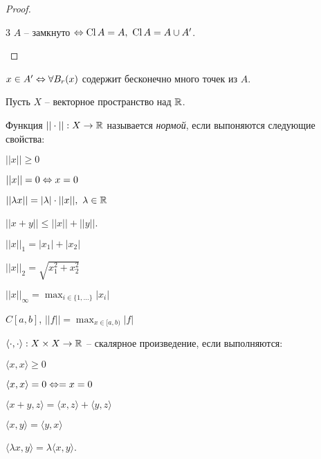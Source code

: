     \begin{proof}
        \begin{MyList}
            \item[3] $A$ -- замкнуто $\Leftrightarrow \operatorname{Cl} A = A, \ \operatorname{Cl} A = A \cup A'$.
        \end{MyList}
    \end{proof}

    \begin{Thm}
        $x \in A' \Leftrightarrow \forall B_r(x)$ содержит бесконечно много точек из $A$.
    \end{Thm}


    Пусть $X$ -- векторное пространство над $\mathbb{R}$.
    \begin{Def}[Норма]
        Функция $||\cdot|| : X \to \mathbb{R}$ называется \textit{нормой}, если выпоняются следующие свойства:
        \begin{MyList}
            \item $||x|| \geqslant 0$
            \item[] $||x|| = 0 \Leftrightarrow x = 0$
            \item $||\lambda x|| = |\lambda| \cdot ||x||, \ \lambda \in \R$
            \item $||x + y|| \leqslant ||x|| + ||y||$.  
        \end{MyList}
    \end{Def}

    \begin{Example}
        $||x||_1 = |x_1| + |x_2|$
    \end{Example}

    \begin{Example}
        $||x||_2 = \sqrt{x_1^2 + x_2^2}$ 
    \end{Example}

    \begin{Example}
        $||x||_\infty = \max_{i \in \{1, ...\}} |x_i|$
    \end{Example}

    \begin{Example}
        $C[a, b]$, $||f|| = \max_{x \in [a, b)} |f|$ 
    \end{Example}

    \begin{Def}
        $\langle \cdot, \cdot \rangle : X \times X \to \mathbb{R}$ -- скалярное произведение, если выполняются:
        \begin{MyList}
            \item $\langle x, x\rangle \geqslant 0$ 
            \item[] $\langle x, x\rangle = 0 \Leftrightarrow = x = 0$
            \item $\langle x + y, z\rangle = \langle x, z\rangle + \langle y, z\rangle$
            \item $\langle x, y\rangle = \langle y, x\rangle$
            \item $\langle \lambda x, y\rangle = \lambda \langle x, y\rangle$. 
        \end{MyList} 
    \end{Def}

